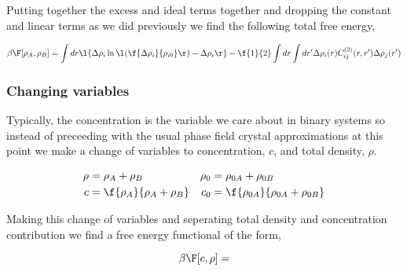 Putting together the excess and ideal terms together and dropping the constant and linear terms as we did previously we find the following total free energy,

\begin{equation}
    \beta\F[\rho_A, \rho_B] = \int dr \l\lbrace \Delta\rho_i \ln\l(\f{\Delta\rho_i}{\rho_{i0}}\r) - \Delta\rho_i\r\rbrace
        - \f{1}{2} \int dr \int dr^\prime \Delta\rho_i(r) C^{(2)}_{ij}(r, r^\prime) \Delta \rho_j(r^\prime)
\end{equation}

\subsubsection{Changing variables}
Typically, the concentration is the variable we care about in binary systems so instead of preceeding with the usual phase field crystal approximations at this point we make a change of variables to concentration, $c$, and total density, $\rho$.

\begin{align}
    \rho &= \rho_A + \rho_B             & \rho_0 &= \rho_{0A} + \rho_{0B} \nonumber \\
    c &= \f{\rho_A}{\rho_A + \rho_B}    &  c_0 &= \f{\rho_{0A}}{\rho_{0A} + \rho_{0B}} \nonumber
\end{align}

Making this change of variables and seperating total density and concentration contribution we find a free energy functional of the form,

\begin{equation}
    \beta\F[c, \rho] =
\end{equation}
